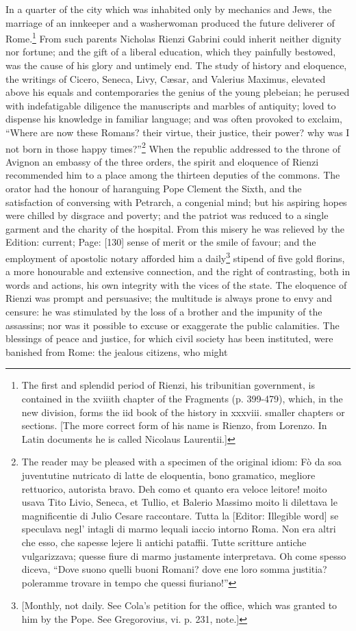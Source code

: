 In a quarter of the city which was inhabited only by mechanics and Jews, the marriage of an innkeeper and a washerwoman produced the future deliverer of Rome.\footnote{The first and splendid period of Rienzi, his tribunitian government, is contained in the xviiith chapter of the Fragments (p. 399-479), which, in the new division, forms the iid book of the history in xxxviii. smaller chapters or sections. [The more correct form of his name is Rienzo, from Lorenzo. In Latin documents he is called Nicolaus Laurentii.]} From such parents Nicholas Rienzi Gabrini could inherit neither dignity nor fortune; and the gift of a liberal education, which they painfully bestowed, was the cause of his glory and untimely end. The study of history and eloquence, the writings of Cicero, Seneca, Livy, Cæsar, and Valerius Maximus, elevated above his equals and contemporaries the genius of the young plebeian; he perused with indefatigable diligence the manuscripts and marbles of antiquity; loved to dispense his knowledge in familiar language; and was often provoked to exclaim, \texthebrew{“}Where are now these Romans? their virtue, their justice, their power? why was I not born in those happy times?\texthebrew{}”\footnote{The reader may be pleased with a specimen of the original idiom: Fò da soa juventutine nutricato di latte de eloquentia, bono gramatico, megliore rettuorico, autorista bravo. Deh como et quanto era veloce leitore! moito usava Tito Livio, Seneca, et Tullio, et Balerio Massimo moito li dilettava le magnificentie di Julio Cesare raccontare. Tutta la [Editor: Illegible word] se speculava negl\texthebrew{}’ intagli di marmo lequali iaccio intorno Roma. Non era altri che esso, che sapesse lejere li antichi pataffii. Tutte scritture antiche vulgarizzava; quesse fiure di marmo justamente interpretava. Oh come spesso diceva, \texthebrew{“}Dove suono quelli buoni Romani? dove ene loro somma justitia? poleramme trovare in tempo che quessi fiuriano!\texthebrew{}”} When the republic addressed to the throne of Avignon an embassy of the three orders, the spirit and eloquence of Rienzi recommended him to a place among the thirteen deputies of the commons. The orator had the honour of haranguing Pope Clement the Sixth, and the satisfaction of conversing with Petrarch, a congenial mind; but his aspiring hopes were chilled by disgrace and poverty; and the patriot was reduced to a single garment and the charity of the hospital. From this misery he was relieved by the Edition: current; Page: [130] sense of merit or the smile of favour; and the employment of apostolic notary afforded him a daily\footnote{[Monthly, not daily. See Cola\texthebrew{}’s petition for the office, which was granted to him by the Pope. See Gregorovius, vi. p. 231, note.]} stipend of five gold florins, a more honourable and extensive connection, and the right of contrasting, both in words and actions, his own integrity with the vices of the state. The eloquence of Rienzi was prompt and persuasive; the multitude is always prone to envy and censure: he was stimulated by the loss of a brother and the impunity of the assassins; nor was it possible to excuse or exaggerate the public calamities. The blessings of peace and justice, for which civil society has been instituted, were banished from Rome: the jealous citizens, who might 